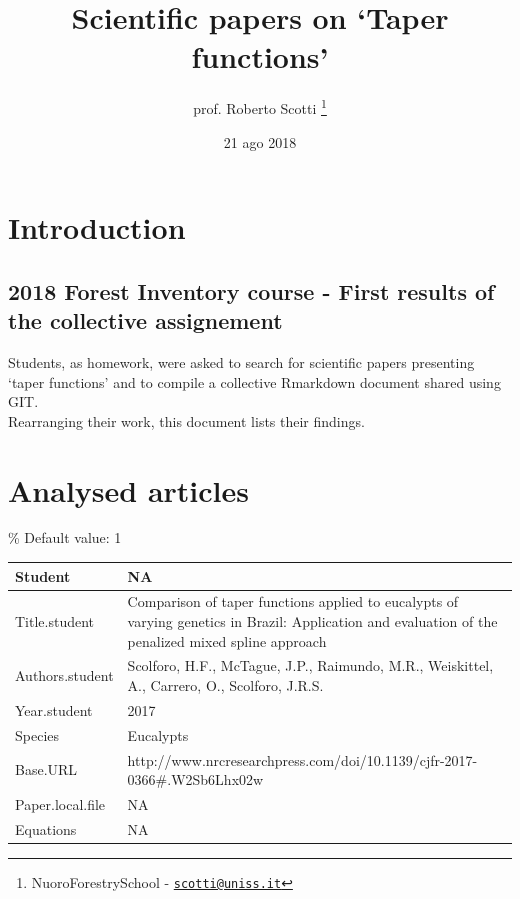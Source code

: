 \documentclass[]{article}
\title{Scientific papers on `Taper functions'}
\author{prof. Roberto Scotti \footnote{NuoroForestrySchool -
  \href{mailto:scotti@uniss.it}{\nolinkurl{scotti@uniss.it}}}}
\date{21 ago 2018}
\begin{document}
\maketitle

\hypertarget{introduction}{%
\section{Introduction}\label{introduction}}

\hypertarget{forest-inventory-course---first-results-of-the-collective-assignement}{%
\subsection{2018 Forest Inventory course - First results of the
collective
assignement}\label{forest-inventory-course---first-results-of-the-collective-assignement}}

Students, as homework, were asked to search for scientific papers
presenting `taper functions' and to compile a collective Rmarkdown
document shared using GIT.\\
Rearranging their work, this document lists their findings.

\hypertarget{analysed-articles}{%
\section{Analysed articles}\label{analysed-articles}}

\renewcommand{\arraystretch}{2}

\% Default value: 1

\begin{tabular}{p{} p{}}
\hline
Student & NA \\ \hline
Title.student & Comparison of taper functions applied to eucalypts of varying genetics in Brazil: Application and evaluation of the penalized mixed spline approach \\ \hline
Authors.student & Scolforo, H.F., McTague, J.P., Raimundo, M.R., Weiskittel, A., Carrero, O., Scolforo, J.R.S. \\ \hline
Year.student & 2017 \\ \hline
Species & Eucalypts \\ \hline
Base.URL & http://www.nrcresearchpress.com/doi/10.1139/cjfr-2017-0366#.W2Sb6Lhx02w \\ \hline
Paper.local.file & NA \\ \hline
Equations & NA \\ \hline
\end{tabular}
\end{document}
